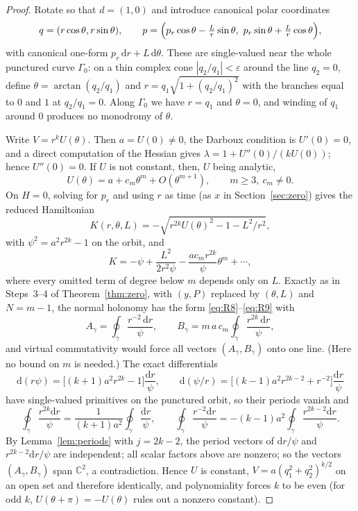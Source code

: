 \documentclass[11pt]{article}
\numberwithin{equation}{section}
\theoremstyle{definition}
\theoremstyle{remark}
\newcommand{\C}{\mathbb C}
\newcommand{\dd}{\mathrm d}
\begin{document}
\begin{proof}
Rotate so that $d=(1,0)$ and introduce canonical polar coordinates
\begin{equation}\label{eq:polar}
q=(r\cos\theta,r\sin\theta),\qquad
p=\Bigl(p_r\cos\theta-\tfrac Lr\sin\theta,\ p_r\sin\theta+\tfrac Lr\cos\theta\Bigr),
\end{equation}
with canonical one-form $p_r\,\dd r+L\,\dd\theta$. These are single-valued near the whole punctured curve $\Gamma_0$:
on a thin complex cone $|q_2/q_1|<\varepsilon$ around the line $q_2=0$, define $\theta=\arctan(q_2/q_1)$ and
$r=q_1\sqrt{1+(q_2/q_1)^2}$ with the branches equal to $0$ and $1$ at $q_2/q_1=0$. Along $\Gamma_0$ we have $r=q_1$ and
$\theta=0$, and winding of $q_1$ around $0$ produces no monodromy of $\theta$.

Write $V=r^kU(\theta)$. Then $a=U(0)\ne0$, the Darboux condition is $U'(0)=0$, and a direct computation of the
Hessian gives $\lambda=1+U''(0)/(kU(0))$; hence $U''(0)=0$. If $U$ is not constant, then, $U$ being analytic,
\begin{equation}\label{eq:O3}
U(\theta)=a+c_m\theta^m+O(\theta^{m+1}),\qquad m\ge3,\ c_m\ne0 .
\end{equation}
On $H=0$, solving for $p_r$ and using $r$ as time (as $x$ in Section~\ref{sec:zero}) gives the reduced Hamiltonian
\begin{equation}\label{eq:O4}
K(r,\theta,L)=-\sqrt{r^{2k}U(\theta)^2-1-L^2/r^2},
\end{equation}
with $\psi^2=a^2r^{2k}-1$ on the orbit, and
\[
K=-\psi+\frac{L^2}{2r^2\psi}-\frac{a c_m r^{2k}}{\psi}\theta^m+\cdots,
\]
where every omitted term of degree below $m$ depends only on $L$. Exactly as in Steps~3--4 of
Theorem~\ref{thm:zero}, with $(y,P)$ replaced by $(\theta,L)$ and $N=m-1$, the normal holonomy has the form
\eqref{eq:R8}--\eqref{eq:R9} with
\begin{equation}\label{eq:O5}
A_\gamma=\oint_\gamma\frac{r^{-2}\,\dd r}{\psi},\qquad B_\gamma=m\,a\,c_m\oint_\gamma\frac{r^{2k}\,\dd r}{\psi},
\end{equation}
and virtual commutativity would force all vectors $(A_\gamma,B_\gamma)$ onto one line. (Here no bound on $m$ is
needed.) The exact differentials
\[
\dd(r\psi)=\bigl[(k+1)a^2r^{2k}-1\bigr]\frac{\dd r}{\psi},\qquad
\dd(\psi/r)=\bigl[(k-1)a^2r^{2k-2}+r^{-2}\bigr]\frac{\dd r}{\psi}
\]
have single-valued primitives on the punctured orbit, so their periods vanish and
\begin{equation}\label{eq:O6}
\oint_\gamma\frac{r^{2k}\dd r}{\psi}=\frac{1}{(k+1)a^2}\oint_\gamma\frac{\dd r}{\psi},\qquad
\oint_\gamma\frac{r^{-2}\dd r}{\psi}=-(k-1)a^2\oint_\gamma\frac{r^{2k-2}\dd r}{\psi}.
\end{equation}
By Lemma~\ref{lem:periods} with $j=2k-2$, the period vectors of $\dd r/\psi$ and $r^{2k-2}\dd r/\psi$ are independent;
all scalar factors above are nonzero; so the vectors $(A_\gamma,B_\gamma)$ span $\C^2$, a contradiction. Hence $U$ is
constant, $V=a(q_1^2+q_2^2)^{k/2}$ on an open set and therefore identically, and polynomiality forces $k$ to be even
(for odd $k$, $U(\theta+\pi)=-U(\theta)$ rules out a nonzero constant).
\end{proof}
\end{document}
